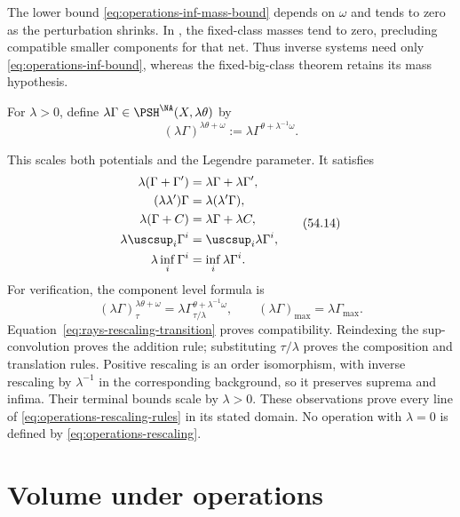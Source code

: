 The lower bound \eqref{eq:operations-inf-mass-bound} depends
on $\omega$ and tends to zero as the perturbation shrinks.
In , the fixed-class masses
tend to zero, precluding compatible smaller components for that net.
Thus inverse systems need only \eqref{eq:operations-inf-bound},
whereas the fixed-big-class theorem retains its mass hypothesis.

\begin{definition}
\label{def:operations-rescaling}
For $\lambda>0$, define
$\lambda\Gamma\in\PSH^{\NA}(X,\lambda\theta)$ by
\[
 (\lambda\Gamma)^{\lambda\theta+\omega}
 :=\lambda\Gamma^{\theta+\lambda^{-1}\omega}.
\tag{54.13}\label{eq:operations-rescaling}
\]
\end{definition}

This scales both potentials and the Legendre parameter.  It satisfies
\[
 \begin{split}
 \lambda(\Gamma+\Gamma')&=\lambda\Gamma+\lambda\Gamma',\\
 (\lambda\lambda')\Gamma&=\lambda(\lambda'\Gamma),\\
 \lambda(\Gamma+C)&=\lambda\Gamma+\lambda C,\\
 \lambda\uscsup_i\Gamma^i&=\uscsup_i\lambda\Gamma^i,\\
 \lambda\inf_i\Gamma^i&=\inf_i\lambda\Gamma^i.
 \end{split}
\tag{54.14}\label{eq:operations-rescaling-rules}
\]
For verification, the component level formula is
\[
 (\lambda\Gamma)_\tau^{\lambda\theta+\omega}
   =\lambda\Gamma_{\tau/\lambda}^{\theta+\lambda^{-1}\omega},
 \qquad (\lambda\Gamma)_{\max}=\lambda\Gamma_{\max}.
\tag{54.14a}\label{eq:operations-rescaled-level}
\]
Equation~\eqref{eq:rays-rescaling-transition} proves compatibility.
Reindexing the sup-convolution proves the addition rule; substituting
$\tau/\lambda$ proves the composition and translation rules.
Positive rescaling is an order isomorphism, with inverse rescaling by
$\lambda^{-1}$ in the corresponding background, so it preserves
suprema and infima.  Their terminal bounds scale by $\lambda>0$.
These observations prove every line of
\eqref{eq:operations-rescaling-rules} in its stated domain.
No operation with $\lambda=0$ is defined by
\eqref{eq:operations-rescaling}.

\section{Volume under operations}
\label{sec:operations-volume}

